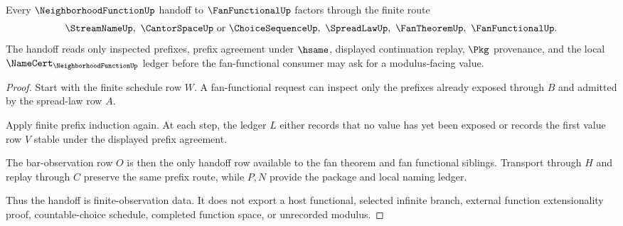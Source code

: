 \begin{theorem}
\label{thm:neighborhood-function-fan-functional-handoff}
Every $\NeighborhoodFunctionUp$ handoff to $\FanFunctionalUp$ factors through the finite route
$$
\StreamNameUp,\ \CantorSpaceUp\ \text{or}\ \ChoiceSequenceUp,\ \SpreadLawUp,\ \FanTheoremUp,\ \FanFunctionalUp .
$$
The handoff reads only inspected prefixes, prefix agreement under $\hsame$, displayed continuation replay, $\Pkg$ provenance, and the local $\NameCert_{\NeighborhoodFunctionUp}$ ledger before the fan-functional consumer may ask for a modulus-facing value.
\end{theorem}
\begin{proof}
Start with the finite schedule row $W$. A fan-functional request can inspect only the prefixes already exposed through $B$ and admitted by the spread-law row $A$.

Apply finite prefix induction again. At each step, the ledger $L$ either records that no value has yet been exposed or records the first value row $V$ stable under the displayed prefix agreement.

The bar-observation row $O$ is then the only handoff row available to the fan theorem and fan functional siblings. Transport through $H$ and replay through $C$ preserve the same prefix route, while $P,N$ provide the package and local naming ledger.

Thus the handoff is finite-observation data. It does not export a host functional, selected infinite branch, external function extensionality proof, countable-choice schedule, completed function space, or unrecorded modulus.
\end{proof}


\begin{closurestatus}{\NeighborhoodFunctionUp}
  \theoryclosure{\seedClosure}
  \formalstatus{\unformalizedV}
\end{closurestatus}
